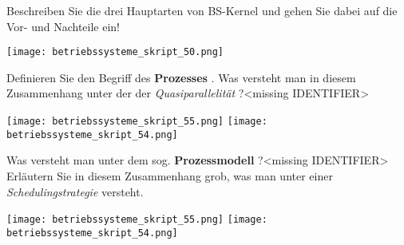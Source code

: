 \documentclass{article}
\begin{document}
\begin{tcolorbox}[colback=white!10!white,colframe=lightgray!75!black,
  savelowerto=\jobname_ex.tex,breakable,enhanced,lines before break=40]

\begin{center}
Beschreiben Sie die drei Hauptarten von BS-Kernel und gehen Sie dabei auf die Vor- und Nachteile ein!

\end{center}

\tcblower

\justifying
\texttt{[image: betriebssysteme\_skript\_50.png]}

\end{tcolorbox}
\begin{tcolorbox}[colback=white!10!white,colframe=lightgray!75!black,
  savelowerto=\jobname_ex.tex,breakable,enhanced,lines before break=40]

\begin{center}
Definieren Sie den Begriff des 
\textbf{Prozesses
}. 
Was versteht man in diesem Zusammenhang unter der der 
\textit{Quasiparallelität
}?<missing IDENTIFIER>

\end{center}

\tcblower

\justifying
\texttt{[image: betriebssysteme\_skript\_55.png]}
\texttt{[image: betriebssysteme\_skript\_54.png]}

\end{tcolorbox}
\begin{tcolorbox}[colback=white!10!white,colframe=lightgray!75!black,
  savelowerto=\jobname_ex.tex,breakable,enhanced,lines before break=40]

\begin{center}
Was versteht man unter dem sog. 
\textbf{Prozessmodell
}?<missing IDENTIFIER>
Erläutern Sie in diesem Zusammenhang grob, was man unter einer 
\textit{Schedulingstrategie
} versteht.

\end{center}

\tcblower

\justifying
\texttt{[image: betriebssysteme\_skript\_55.png]}
\texttt{[image: betriebssysteme\_skript\_54.png]}

\end{tcolorbox}
\end{document}

